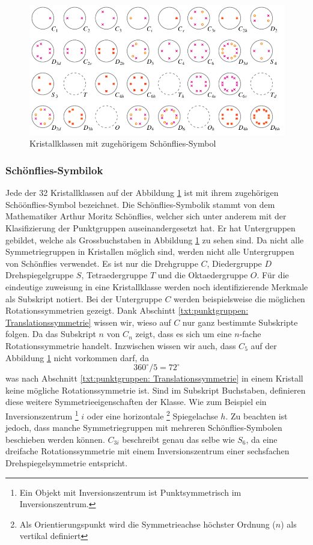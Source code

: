 \begin{figure}
    \centering
    \includegraphics[]{papers/punktgruppen/figures/projections}
    \caption{Kristallklassen mit zugehörigem Schönflies-Symbol}
    \label{fig:punktgruppen:Kristallkassen}
\end{figure}

\subsubsection{Schönflies-Symbilok}

Jede der 32 Kristallklassen auf der Abbildung \ref{fig:punktgruppen:Kristallkassen} ist mit ihrem zugehörigen Schöönflies-Symbol bezeichnet.
Die Schönflies-Symbolik stammt von dem Mathematiker Arthur Moritz Schönflies, 
welcher sich unter anderem mit der Klasifizierung der Punktgruppen auseinandergesetzt hat.
Er hat Untergruppen gebildet, welche als Grossbuchstaben in Abbildung \ref{fig:punktgruppen:Kristallkassen} zu sehen sind.
Da nicht alle Symmetriegruppen in Kristallen möglich sind, werden nicht alle Untergruppen von Schönflies verwendet.
Es ist nur die Drehgruppe \(C\), Diedergruppe \(D\) Drehspiegelgruppe \(S\), Tetraedergruppe \(T\) und die Oktaedergruppe \(O\).
Für die eindeutige zuweisung in eine Kristallklasse werden noch identifizierende Merkmale als Subskript notiert.
Bei der Untergruppe \(C\) werden beispielsweise die möglichen Rotationssymmetrien gezeigt.
Dank Abschintt \ref{txt:punktgruppen: Translationssymmetrie} wissen wir, wieso auf \(C\) nur ganz bestimmte Subskripte folgen.
Da das Subskript \(n\) von \(C_n\) zeigt, dass es sich um eine \(n\)-fache Rotationssymmetrie handelt.
Inzwischen wissen wir auch, dass \(C_5\) auf der Abbildung \ref{fig:punktgruppen:Kristallkassen} nicht vorkommen darf, da 
\[
    360^\circ/5 =  72^\circ
\]
was nach Abschnitt \ref{txt:punktgruppen: Translationssymmetrie} in einem Kristall keine mögliche Rotationssymmetrie ist.
Sind im Subskript Buchstaben, definieren diese weitere Symmetrieeigenschaften der Klasse.
Wie zum Beispiel ein Inversionszentrum
\footnote{Ein Objekt mit Inversionszentrum ist Punktsymmetrisch im Inversionszentrum.}
\(i\) oder eine horizontale
\footnote{Als Orientierungspunkt wird die Symmetrieachse höchster Ordnung (\(n\)) als vertikal definiert} 
Spiegelachse \(h\). 
Zu beachten ist jedoch, dass manche Symmetriegruppen mit mehreren Schönflies-Symbolen beschieben werden können.
\(C_{3i}\) beschreibt genau das selbe wie \(S_6\), da eine dreifache Rotationssymmetrie mit einem Inversionszentrum einer
sechsfachen Drehspiegelsymmetrie entspricht.




